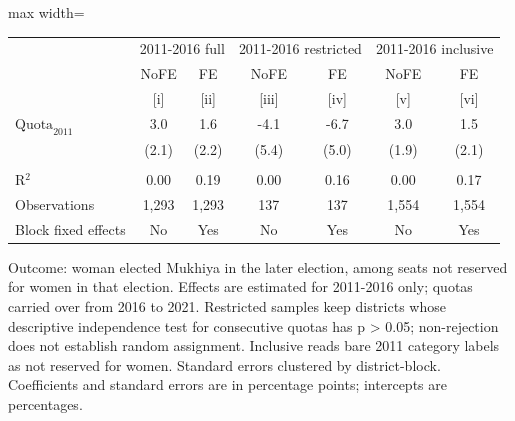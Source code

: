 
\begingroup
\centering
\scriptsize
\begin{adjustbox}{max width=\linewidth}
   \begin{threeparttable}[b]
      \begin{tabular}{lcccccc}
         \toprule
          & \multicolumn{2}{c}{2011-2016 full} & \multicolumn{2}{c}{2011-2016 restricted} & \multicolumn{2}{c}{2011-2016 inclusive} \\
                                & NoFE  & FE    & NoFE  & FE    & NoFE  & FE \\
                                & [i]   & [ii]  & [iii] & [iv]  & [v]   & [vi]\\
         \midrule
         $\text{Quota}_{2011}$  & 3.0   & 1.6   & -4.1  & -6.7  & 3.0   & 1.5\\
                                & (2.1) & (2.2) & (5.4) & (5.0) & (1.9) & (2.1)\\
          \\
         R$^2$                  & 0.00  & 0.19  & 0.00  & 0.16  & 0.00  & 0.17\\
         Observations           & 1,293 & 1,293 & 137   & 137   & 1,554 & 1,554\\
         Block fixed effects    & No    & Yes   & No    & Yes   & No    & Yes\\
         \bottomrule
      \end{tabular}

      \begin{tablenotes}
         \item Outcome: woman elected Mukhiya in the later election, among seats not reserved for women in that election. Effects are estimated for 2011-2016 only; quotas carried over from 2016 to 2021. Restricted samples keep districts whose descriptive independence test for consecutive quotas has p > 0.05; non-rejection does not establish random assignment. Inclusive reads bare 2011 category labels as not reserved for women. Standard errors clustered by district-block. Coefficients and standard errors are in percentage points; intercepts are percentages.
      \end{tablenotes}
   \end{threeparttable}
\end{adjustbox}
\par\endgroup


